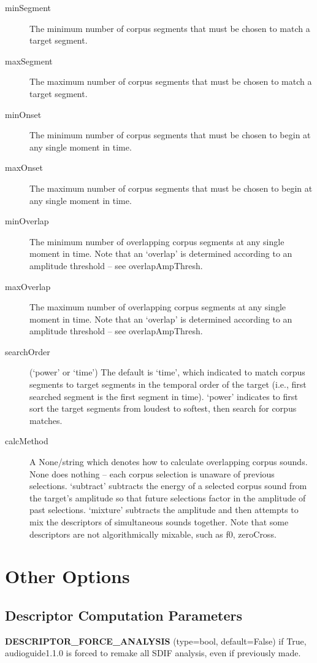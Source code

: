 \documentclass{article}
\newcommand{\optEntry}[4]{\textbf{#1} (type=#2, default=#3) #4\hspace{0.5em}\\}
\newcommand{\ag}{audioguide1.1.0\xspace}
\begin{document}
\begin{spacing}{1.2}
\begin{description}

\item[minSegment] The minimum number of corpus segments that must be chosen to match a target segment.
\item[maxSegment] The maximum number of corpus segments that must be chosen to match a target segment.
\item[minOnset] The minimum number of corpus segments that must be chosen to begin at any single moment in time.
\item[maxOnset] The maximum number of corpus segments that must be chosen to begin at any single moment in time.
\item[minOverlap] The minimum number of overlapping corpus segments at any single moment in time.  Note that an `overlap' is determined according to an amplitude threshold -- see overlapAmpThresh.
\item[maxOverlap] The maximum number of overlapping corpus segments at any single moment in time.  Note that an `overlap' is determined according to an amplitude threshold -- see overlapAmpThresh.

\item[searchOrder] (`power' or `time')  The default is `time', which indicated to match corpus segments to target segments in the temporal order of the target (i.e., first searched segment is the first segment in time).  `power' indicates to first sort the target segments from loudest to softest, then search for corpus matches.

\item[calcMethod] A None/string which denotes how to calculate overlapping corpus sounds.  None does nothing -- each corpus selection is unaware of previous selections.  `subtract' subtracts the energy of a selected corpus sound from the target's amplitude so that future selections factor in the amplitude of past selections.  `mixture' subtracts the amplitude and then attempts to mix the descriptors of simultaneous sounds together.  Note that some descriptors are not algorithmically mixable, such as f0, zeroCross.
\end{description}




\section{Other Options}\label{otheroptions}
\subsection{Descriptor Computation Parameters}
\optEntry{DESCRIPTOR\_FORCE\_ANALYSIS}{bool}{False}{if True, \ag is forced to remake all SDIF analysis, even if previously made.}


\end{spacing}
\end{document}
